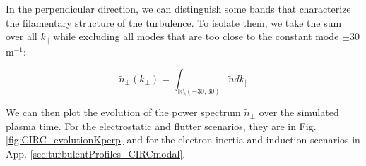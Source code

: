 In the perpendicular direction, we can distinguish some bands that characterize the filamentary structure of the turbulence. To isolate them, we take the sum over all $k_\parallel$ while excluding all modes that are too close to the constant mode $\pm30$m$^{-1}$:

\begin{equation}
	\tilde{n}_\perp(k_\perp) = \int_{\mathbb{R}\setminus (-30, 30)}\tilde{n}dk_\parallel
\end{equation}

We can then plot the evolution of the power spectrum $\tilde{n}_\perp$ over the simulated plasma time. For the electrostatic and flutter scenarios, they are in Fig. \ref{fig:CIRC_evolutionKperp} and for the electron inertia and induction scenarios in App. \ref{sec:turbulentProfiles_CIRCmodal}.

